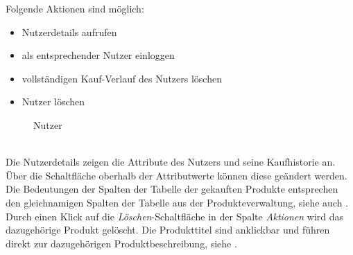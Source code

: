 Folgende Aktionen sind möglich:
\begin{itemize}
  \item Nutzerdetails aufrufen 
  \vspace*{-0.5em}
  \item als entsprechender Nutzer einloggen 
  \vspace*{-0.5em}
  \item vollständigen Kauf-Verlauf des Nutzers löschen 
  \vspace*{-0.5em}
  \item Nutzer löschen 
\end{itemize}

\begin{figure}[h!]
  \centering
  \caption{Nutzer}
  \label{fig:Nutzer}
\end{figure}
\text{}\vspace*{-1em}\\
Die Nutzerdetails  zeigen die Attribute des Nutzers und seine Kaufhistorie an. Über die Schaltfläche oberhalb der Attributwerte  können diese ge\-än\-dert werden. Die Bedeutungen der Spalten der Tabelle der gekauften Produkte entsprechen den gleichnamigen Spalten der Tabelle aus der Produkteverwaltung, siehe auch . Durch einen Klick auf die \textit{Löschen}-Schaltfläche  in der Spalte \textit{Aktionen} wird das dazugehörige Produkt gelöscht. Die Produkttitel sind anklickbar und führen direkt zur dazugehörigen Produktbeschreibung, siehe .

